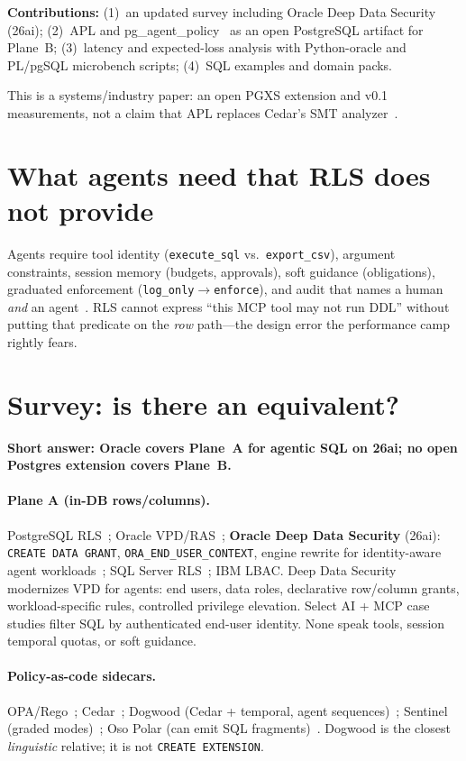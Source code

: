 \documentclass[sigconf,review]{acmart}
\begin{document}
\textbf{Contributions:} (1)~an updated survey including Oracle Deep Data Security (26ai); (2)~APL and pg\_agent\_policy~\cite{pgagentpolicy} as an open PostgreSQL artifact for Plane~B; (3)~latency and expected-loss analysis with Python-oracle and PL/pgSQL microbench scripts; (4)~SQL examples and domain packs.

This is a systems/industry paper: an open PGXS extension and v0.1 measurements, not a claim that APL replaces Cedar's SMT analyzer~\cite{cedar2024}.

\section{What agents need that RLS does not provide}

Agents require tool identity (\texttt{execute\_sql} vs.\ \texttt{export\_csv}), argument constraints, session memory (budgets, approvals), soft guidance (obligations), graduated enforcement (\texttt{log\_only}$\rightarrow$\texttt{enforce}), and audit that names a human \emph{and} an agent~\cite{eu-ai-act}. RLS cannot express ``this MCP tool may not run DDL'' without putting that predicate on the \emph{row} path---the design error the performance camp rightly fears.

\section{Survey: is there an equivalent?}

\textbf{Short answer: Oracle covers Plane~A for agentic SQL on 26ai; no open Postgres extension covers Plane~B.}

\paragraph{Plane A (in-DB rows/columns).}
PostgreSQL RLS~\cite{pg-rls}; Oracle VPD/RAS~\cite{oracle-vpd}; \textbf{Oracle Deep Data Security} (26ai): \texttt{CREATE DATA GRANT}, \texttt{ORA\_END\_USER\_CONTEXT}, engine rewrite for identity-aware agent workloads~\cite{oracle-dds-blog,oracle-dds-docs,oracle-data-grant}; SQL Server RLS~\cite{mssql-rls}; IBM LBAC. Deep Data Security modernizes VPD for agents: end users, data roles, declarative row/column grants, workload-specific rules, controlled privilege elevation. Select AI + MCP case studies filter SQL by authenticated end-user identity. None speak tools, session temporal quotas, or soft guidance.

\paragraph{Policy-as-code sidecars.}
OPA/Rego~\cite{opa}; Cedar~\cite{cedar2024}; Dogwood (Cedar + temporal, agent sequences)~\cite{dogwood2026}; Sentinel (graded modes)~\cite{sentinel}; Oso Polar (can emit SQL fragments)~\cite{oso-polar}. Dogwood is the closest \emph{linguistic} relative; it is not \texttt{CREATE EXTENSION}.
\end{document}
